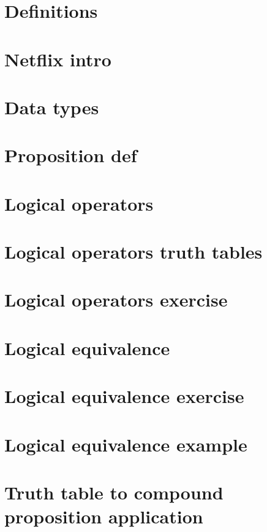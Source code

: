 
\section*{Definitions}

\vfill
\section*{Netflix intro}

\vfill
\section*{Data types}

\vfill
\section*{Proposition def}

\vfill
\section*{Logical operators}

\vfill
\section*{Logical operators truth tables}

\vfill
\section*{Logical operators exercise}

\vfill
\section*{Logical equivalence}

\vfill
\section*{Logical equivalence exercise}

\vfill
\section*{Logical equivalence example}

\vfill
\section*{Truth table to compound proposition application}

\vfill
